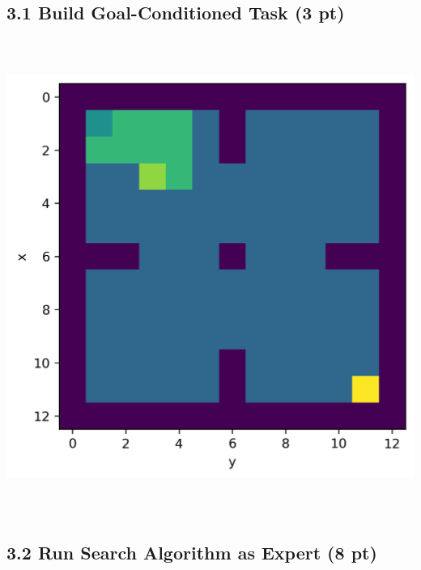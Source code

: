 \documentclass[12pt]{article}
\begin{document}
\subsection*{3.1 Build Goal-Conditioned Task (3 pt)}
\includegraphics[height= 15.5cm, width=15.5cm]{p3-1-1}



\subsection*{3.2 Run Search Algorithm as Expert (8 pt)}
\end{document}

